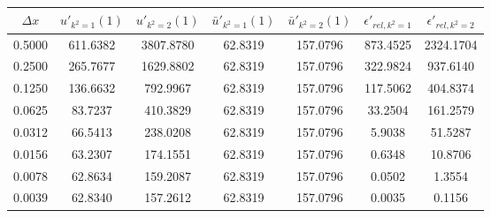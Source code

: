 \begin{tabular}{|c|c|c|c|c|c|c|}
\hline
\textbf{$\Delta x$}&\textbf{$u'_{k^2=1}(1)$}&\textbf{$u'_{k^2=2}(1)$}&\textbf{$\bar{u}'_{k^2=1}(1)$}&\textbf{$\bar{u}'_{k^2=2}(1)$}&\textbf{$\epsilon'_{rel,k^2=1}$}&\textbf{$\epsilon'_{rel,k^2=2}$}\\\hline
0.5000&611.6382&3807.8780&62.8319&157.0796&873.4525&2324.1704\\\hline
0.2500&265.7677&1629.8802&62.8319&157.0796&322.9824&937.6140\\\hline
0.1250&136.6632&792.9967&62.8319&157.0796&117.5062&404.8374\\\hline
0.0625&83.7237&410.3829&62.8319&157.0796&33.2504&161.2579\\\hline
0.0312&66.5413&238.0208&62.8319&157.0796&5.9038&51.5287\\\hline
0.0156&63.2307&174.1551&62.8319&157.0796&0.6348&10.8706\\\hline
0.0078&62.8634&159.2087&62.8319&157.0796&0.0502&1.3554\\\hline
0.0039&62.8340&157.2612&62.8319&157.0796&0.0035&0.1156\\\hline
\end{tabular}
